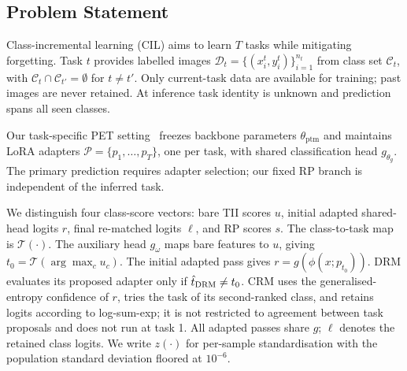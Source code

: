 \documentclass[runningheads]{llncs}
\begin{document}
\subsection{Problem Statement}

Class-incremental learning (CIL) aims to learn $T$ tasks while mitigating
forgetting. Task $t$ provides labelled images
$\mathcal D_t=\{(x_i^t,y_i^t)\}_{i=1}^{n_t}$ from class set $\mathcal C_t$,
with $\mathcal C_t\cap\mathcal C_{t'}=\emptyset$ for $t\ne t'$.
Only current-task data are available for training; past images are never
retained. At inference task identity is unknown and prediction spans all seen
classes.

Our task-specific PET setting~\cite{ref_hide,ref_hrmpet} freezes backbone
parameters $\theta_{\mathrm{ptm}}$ and maintains LoRA adapters
$\mathcal P=\{p_1,\dots,p_T\}$, one per task, with shared classification head
$g_{\theta_g}$. The primary prediction requires adapter selection; our fixed
RP branch is independent of the inferred task.

We distinguish four class-score vectors: bare TII scores $u$, initial adapted
shared-head logits $r$, final re-matched logits $\ell$, and RP scores $s$.
The class-to-task map is $\mathcal T(\cdot)$. The auxiliary head $g_\omega$
maps bare features to $u$, giving $t_0=\mathcal T(\arg\max_c u_c)$.
The initial adapted pass gives $r=g(\phi(x;p_{t_0}))$.
DRM evaluates its proposed adapter only if $\hat t_{\rm DRM}\ne t_0$.
CRM uses the generalised-entropy confidence of $r$, tries the task of its
second-ranked class, and retains logits according to log-sum-exp; it is not
restricted to agreement between task proposals and does not run at task 1.
All adapted passes share $g$; $\ell$ denotes the retained class logits.
We write
$z(\cdot)$ for per-sample standardisation with the population standard
deviation floored at $10^{-6}$.
\end{document}
